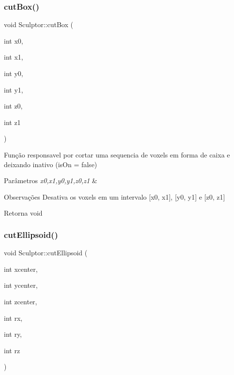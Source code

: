 \subsubsection{\texorpdfstring{cut\+Box()}{cutBox()}}
{\footnotesize\ttfamily void Sculptor\+::cut\+Box (\begin{DoxyParamCaption}\item[{int}]{x0,  }\item[{int}]{x1,  }\item[{int}]{y0,  }\item[{int}]{y1,  }\item[{int}]{z0,  }\item[{int}]{z1 }\end{DoxyParamCaption})}



Função responsavel por cortar uma sequencia de voxels em forma de caixa e deixando inativo (is\+On = false) 


\begin{DoxyParams}{Parâmetros}
{\em x0,x1,y0,y1,z0,z1} & \\
\hline
\end{DoxyParams}
\begin{DoxyRemark}{Observações}
Desativa os voxels em um intervalo \mbox{[}x0, x1\mbox{]}, \mbox{[}y0, y1\mbox{]} e \mbox{[}z0, z1\mbox{]} 
\end{DoxyRemark}
\begin{DoxyReturn}{Retorna}
void 
\end{DoxyReturn}
\mbox{\label{class_sculptor_a18d2922c111c4c13653ee07d878151ad}} 
\subsubsection{\texorpdfstring{cut\+Ellipsoid()}{cutEllipsoid()}}
{\footnotesize\ttfamily void Sculptor\+::cut\+Ellipsoid (\begin{DoxyParamCaption}\item[{int}]{xcenter,  }\item[{int}]{ycenter,  }\item[{int}]{zcenter,  }\item[{int}]{rx,  }\item[{int}]{ry,  }\item[{int}]{rz }\end{DoxyParamCaption})}



